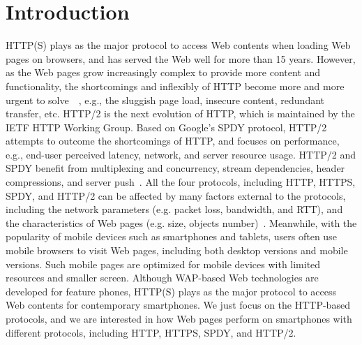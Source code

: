 \section{Introduction}

HTTP(S) plays as the major protocol to access Web contents when loading Web pages on browsers, and has served the Web well for more than 15 years. However, as the Web pages grow increasingly complex to provide more content and functionality, the shortcomings and inflexibly of HTTP become more and more urgent to solve~\cite{Stenberg:CCR14}~\cite{httpproblem}, e.g., the sluggish page load, insecure content, redundant transfer, etc. HTTP/2 is the next evolution of HTTP, which is maintained by the IETF HTTP Working Group. Based on Google's SPDY protocol, HTTP/2 attempts to outcome the shortcomings of HTTP, and focuses on performance, e.g., end-user perceived latency, network, and server resource usage. HTTP/2 and SPDY benefit from multiplexing and concurrency, stream dependencies, header compressions, and server push~\cite{Stenberg:CCR14}. All the four protocols, including HTTP, HTTPS, SPDY, and HTTP/2 can be affected by many factors external to the protocols, including the network parameters (e.g. packet loss, bandwidth, and RTT), and the characteristics of Web pages (e.g. size, objects number)~\cite{Wang:NSDI14,Saxce:INFCOM15, Varvello:CORR15, Erman:CONEXT13, El-khatibTW:IFIP14}. Meanwhile, with the popularity of mobile devices such as smartphones and tablets, users often use mobile browsers to visit Web pages, including both desktop versions and mobile versions. Such mobile pages are optimized for mobile devices with limited resources and smaller screen. Although WAP-based Web technologies are developed for feature phones, HTTP(S) plays as the major protocol to access Web contents for contemporary smartphones. We just focus on the HTTP-based protocols, and we are interested in how Web pages perform on smartphones with different protocols, including HTTP, HTTPS, SPDY, and HTTP/2.

